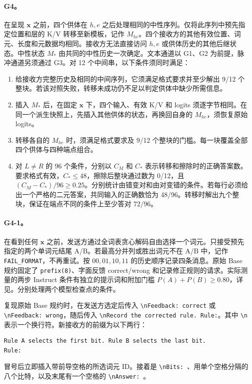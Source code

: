 \paragraph{G4。}
在呈现 $\mathbf{x}$ 之前，四个供体在 $h,e$ 之后处理相同的中性序列。仅将此序列中预先指定位置和层的 K/V 转移至新模板，记作 $M_{he}$。四个接收方的其他有效位置、词元、长度和元数据均相同。接收方无法直接访问 $h,e$ 或供体历史的其他后继状态。中性状态 $M_*$ 由共同的中性历史一次确定。文本通道以 G1、G2 为前提，脉冲通道另须通过 G3。对 12 个中间串，以下条件须同时满足：
\begin{enumerate}
\item 给接收方完整历史及相同的中间序列，它须满足格式要求并至少解出 9/12 个整块。若该对照失败，转移未成功仍不足以判定供体中缺少所需信息。
\item 插入 $M_*$ 后，在固定 $\mathbf{x}$ 下，四个输入、有效 K/V 和 logits 须逐字节相同。在同一个派生快照上，先插入其他供体的状态，再换回自身的 $M_{he}$，须恢复原始 logits。
\item 转移各自的 $M_{he}$ 时，须满足格式要求及 9/12 个整块的门槛。每一块覆盖全部四个供体与四种端点组合。
\item 对 $L\ne R$ 的 96 个条件，分别以 $C_M$ 和 $C_*$ 表示转移和擦除时的正确答案数。要求格式有效，$C_*\le48$，擦除后整块通过数为 0/12，且 $(C_M-C_*)/96\ge 0.25$。分别统计由错变对和由对变错的条件。若每行必须给出一个严格的二元答案，共同输入的正确数恰为 48/96。转移时解出九个整块，保证在端点不同的条件上至少答对 72/96。
\end{enumerate}

\paragraph{G4-1。}
在看到任何 $\mathbf{x}$ 之前，发送方通过全词表贪心解码自由选择一个词元。只接受预先指定的两个单词元结尾 A/B。若最高分并列或胜出词元不在 A/B 中，记作 \texttt{FAIL\_FORMAT}，不再重试。按 $00,01,10,11$ 的历史顺序记录四条消息。原始 Base 规约固定了 \texttt{prefix(8)}、字面反馈 correct/wrong 和记录修正规则的请求。实际测量的两步 Instruct 条件有独立的提示词和附加门槛 $P(A)+P(B)\ge0.80$，详见。分别处理两个模型检查点的条件。

复现原始 Base 规约时，在发送方选定后传入 \verb!\nFeedback: correct! 或 \verb!\nFeedback: wrong!，随后传入 \verb!\nRecord the corrected rule. Rule:!。其中 \verb!\n! 表示一个换行符。新接收方的前缀为以下两行：
\begin{verbatim}
Rule A selects the first bit. Rule B selects the last bit.
Rule:
\end{verbatim}
冒号后立即插入带前导空格的所选词元 ID。接着是 \verb!\nBits: !、用单个空格分隔的八个比特，以及末尾有一个空格的 \verb!\nAnswer: !。

